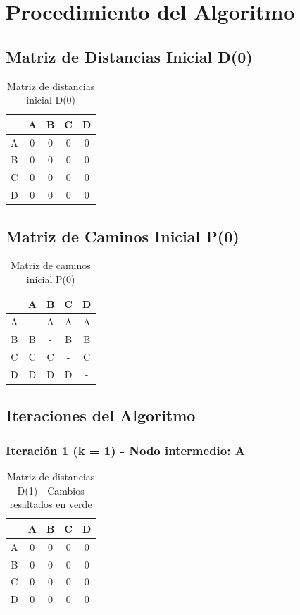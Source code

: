 \documentclass[12pt]{article}
\begin{document}
\clearpage
\section{Procedimiento del Algoritmo}
\subsection{Matriz de Distancias Inicial D(0)}
\begin{table}[h!]
\centering
\begin{tabular}{|c|c|c|c|c|}
\hline
 & A & B & C & D \\\hline
A & 0 & 0 & 0 & 0 \\\hline
B & 0 & 0 & 0 & 0 \\\hline
C & 0 & 0 & 0 & 0 \\\hline
D & 0 & 0 & 0 & 0 \\\hline
\end{tabular}
\caption{Matriz de distancias inicial D(0)}
\end{table}

\clearpage
\subsection{Matriz de Caminos Inicial P(0)}
\begin{table}[h!]
\centering
\begin{tabular}{|c|c|c|c|c|}
\hline
 & A & B & C & D \\\hline
A & - & A & A & A \\\hline
B & B & - & B & B \\\hline
C & C & C & - & C \\\hline
D & D & D & D & - \\\hline
\end{tabular}
\caption{Matriz de caminos inicial P(0)}
\end{table}

\subsection{Iteraciones del Algoritmo}
\clearpage
\subsubsection{Iteración 1 (k = 1) - Nodo intermedio: A}
\begin{table}[h!]
\centering
\begin{tabular}{|c|c|c|c|c|}
\hline
 & A & B & C & D \\\hline
A & 0 & 0 & 0 & 0 \\\hline
B & 0 & 0 & 0 & 0 \\\hline
C & 0 & 0 & 0 & 0 \\\hline
D & 0 & 0 & 0 & 0 \\\hline
\end{tabular}
\caption{Matriz de distancias D(1) - Cambios resaltados en verde}
\end{table}
\end{document}
